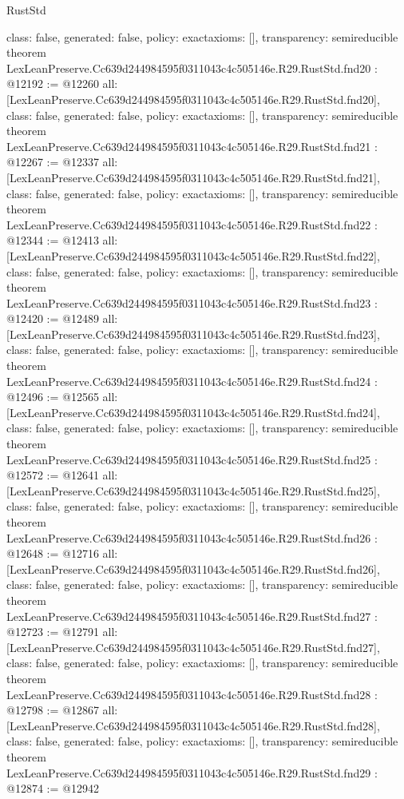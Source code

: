 \begin{lexlean}{RustStd}
\begin{coremodule}
{  class: false,
  generated: false,
  policy: exact{axioms: []},
  transparency: semireducible
}
theorem LexLeanPreserve.Cc639d244984595f0311043c4c505146e.R29.RustStd.fnd20 : @12192 := @12260 {
  all: [LexLeanPreserve.Cc639d244984595f0311043c4c505146e.R29.RustStd.fnd20],
  class: false,
  generated: false,
  policy: exact{axioms: []},
  transparency: semireducible
}
theorem LexLeanPreserve.Cc639d244984595f0311043c4c505146e.R29.RustStd.fnd21 : @12267 := @12337 {
  all: [LexLeanPreserve.Cc639d244984595f0311043c4c505146e.R29.RustStd.fnd21],
  class: false,
  generated: false,
  policy: exact{axioms: []},
  transparency: semireducible
}
theorem LexLeanPreserve.Cc639d244984595f0311043c4c505146e.R29.RustStd.fnd22 : @12344 := @12413 {
  all: [LexLeanPreserve.Cc639d244984595f0311043c4c505146e.R29.RustStd.fnd22],
  class: false,
  generated: false,
  policy: exact{axioms: []},
  transparency: semireducible
}
theorem LexLeanPreserve.Cc639d244984595f0311043c4c505146e.R29.RustStd.fnd23 : @12420 := @12489 {
  all: [LexLeanPreserve.Cc639d244984595f0311043c4c505146e.R29.RustStd.fnd23],
  class: false,
  generated: false,
  policy: exact{axioms: []},
  transparency: semireducible
}
theorem LexLeanPreserve.Cc639d244984595f0311043c4c505146e.R29.RustStd.fnd24 : @12496 := @12565 {
  all: [LexLeanPreserve.Cc639d244984595f0311043c4c505146e.R29.RustStd.fnd24],
  class: false,
  generated: false,
  policy: exact{axioms: []},
  transparency: semireducible
}
theorem LexLeanPreserve.Cc639d244984595f0311043c4c505146e.R29.RustStd.fnd25 : @12572 := @12641 {
  all: [LexLeanPreserve.Cc639d244984595f0311043c4c505146e.R29.RustStd.fnd25],
  class: false,
  generated: false,
  policy: exact{axioms: []},
  transparency: semireducible
}
theorem LexLeanPreserve.Cc639d244984595f0311043c4c505146e.R29.RustStd.fnd26 : @12648 := @12716 {
  all: [LexLeanPreserve.Cc639d244984595f0311043c4c505146e.R29.RustStd.fnd26],
  class: false,
  generated: false,
  policy: exact{axioms: []},
  transparency: semireducible
}
theorem LexLeanPreserve.Cc639d244984595f0311043c4c505146e.R29.RustStd.fnd27 : @12723 := @12791 {
  all: [LexLeanPreserve.Cc639d244984595f0311043c4c505146e.R29.RustStd.fnd27],
  class: false,
  generated: false,
  policy: exact{axioms: []},
  transparency: semireducible
}
theorem LexLeanPreserve.Cc639d244984595f0311043c4c505146e.R29.RustStd.fnd28 : @12798 := @12867 {
  all: [LexLeanPreserve.Cc639d244984595f0311043c4c505146e.R29.RustStd.fnd28],
  class: false,
  generated: false,
  policy: exact{axioms: []},
  transparency: semireducible
}
theorem LexLeanPreserve.Cc639d244984595f0311043c4c505146e.R29.RustStd.fnd29 : @12874 := @12942 {
}
\end{coremodule}
\end{lexlean}
